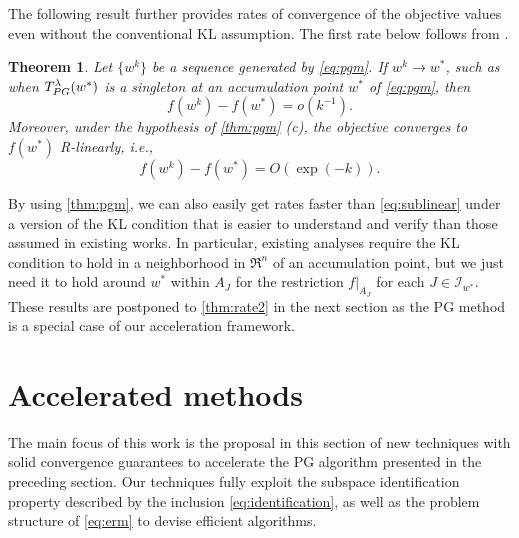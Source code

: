 \documentclass{article}
\newcommand{\alert}[1]{{#1}}
\theoremstyle{plain}
\newtheorem{theorem}{Theorem}[section]
\theoremstyle{definition}
\theoremstyle{remark}
\newcommand{\I}{\mathcal{I}}
\newcommand{\N}{\mathbb{N}}
\newcommand{\Tpg}{T_{\rm PG}^{\lambda}}
\newcommand{\norm}[1]{{\left\|{#1}\right\|}}
\begin{document}
The following result further provides rates of convergence of the 
objective values even without the conventional KL assumption.
The first rate below follows from \cite{LeeW19a}.

\begin{theorem}
	\label{thm:sublinear}
	\alert{Let $\{w ^k\}$ be a sequence generated by \cref{eq:pgm}}.
	If $w^k\to w^*$, such as when $\Tpg (w^*)$ is a singleton at an 
	accumulation 
	point $w^*$ of \cref{eq:pgm}, then
		\begin{equation}
		\label{eq:sublinear}
		f(w^k) - f(w^*) = \alert{o}(k^{-1}).
		\end{equation}
		Moreover, under the hypothesis of \cref{thm:pgm} (c), the
		objective converges to $f(w^*)$ R-linearly, i.e., 		
			\begin{equation}
			f(w^k) - f(w^*) = O(\exp(-k)).
			\label{eq:linear}
			\end{equation}
\end{theorem}

By using \cref{thm:pgm}, we can also easily get
rates faster than \cref{eq:sublinear} under a version of the KL
condition that is easier to understand and verify than those assumed
in existing works.
In particular, existing analyses require the KL condition to hold in a
neighborhood in $\Re^n$ of an
accumulation point, but we just need it
to hold around $w^*$ within $A_J$ for the restriction $f|_{A_J}$ for each $J \in 
\I_{w^*}$.
These results are postponed to \cref{thm:rate2} in the next section as
the PG method is a special case of our acceleration framework.

\section{Accelerated methods}
\label{sec:accelerate}

The main focus of this work is the proposal in this section of new
techniques with solid convergence guarantees to accelerate the PG
algorithm presented in the preceding section.
Our techniques fully exploit the subspace identification property
described by the inclusion \cref{eq:identification}, as well as the
problem structure of \cref{eq:erm} to devise efficient algorithms.
\end{document}
